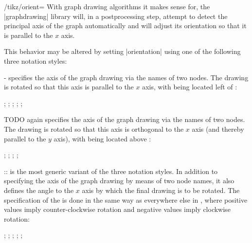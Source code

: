 \begin{key}{/tikz/orient=}
  With graph drawing algorithms it makes sense for, the |graphdrawing|
  library will, in a postprocessing step, attempt to detect the 
  principal axis of the graph automatically and will adjust its 
  orientation so that it is parallel to the $x$ axis.

  This behavior may be altered by setting |orientation| using one of
  the following three notation styles:

  - specifies the axis of
  the graph drawing via the names of two nodes. The drawing is rotated
  so that this axis is parallel to the $x$ axis, with  being located left of :
  \begin{codeexample}[]
\tikz {};
\tikz {};
\tikz {};
\tikz {};
\tikz {};
  \end{codeexample}

  TODO again specifies the
  axis of the graph drawing via the names of two nodes. The drawing is
  rotated so that this axis is orthogonal to the $x$ axis (and thereby 
  parallel to the $y$ axis), with  being located
  above :
  \begin{codeexample}[]
\tikz {};
\tikz {};
\tikz {};
\tikz {};
  \end{codeexample}

  :: is the
  most generic variant of the three notation styles. In addition to
  specifying the axis of the graph drawing by means of two node names,
  it also defines the angle to the $x$ axis by which the final drawing 
  is to be rotated. The specification of the  is done in the
  same way as everywhere else in \tikzname, where positive values imply
  counter-clockwise rotation and negative values imply clockwise
  rotation:
  \begin{codeexample}[]
\tikz {};
\tikz {};
\tikz {};
\tikz {};
\tikz {};
  \end{codeexample}
\end{key}

